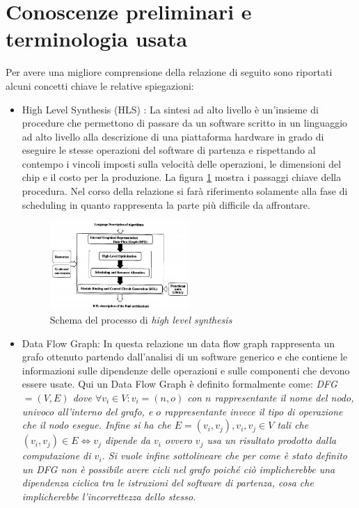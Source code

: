 \documentclass[]{IEEEtran}
\begin{document}
\section{Conoscenze preliminari e terminologia usata}

Per avere una migliore comprensione della relazione di seguito sono riportati alcuni concetti chiave le relative spiegazioni:
\begin{itemize}
	\item High Level Synthesis (HLS) \cite{HLS}: La sintesi ad alto livello è un'insieme di procedure che permettono di passare da un software scritto in un linguaggio ad alto livello alla descrizione di una piattaforma hardware in grado di eseguire le stesse operazioni del software di partenza e rispettando al contempo i vincoli imposti sulla velocità delle operazioni, le dimensioni del chip e il costo per la produzione. La figura \ref{hls} mostra i passaggi chiave della procedura. Nel corso della relazione si farà riferimento solamente alla fase di scheduling in quanto rappresenta la parte più difficile da affrontare.
	\begin{figure}[htp]
		\includegraphics[width=0.5\textwidth]{images/Hls_flow.png}
		\caption{Schema del processo di \emph{high level synthesis}}
		\label{hls}
	\end{figure}
	
	\item Data Flow Graph: In questa relazione un data flow graph rappresenta un grafo ottenuto partendo dall'analisi di un software generico e che contiene le informazioni sulle dipendenze delle operazioni e sulle componenti che devono essere usate. Qui un Data Flow Graph è definito formalmente come:
	\it{DFG} \normalfont $=(V,E)$ dove $\forall v_i\in V : v_i = (n,o)$ con $n$ rappresentante il nome del nodo, \emph{univoco} all'interno del grafo, e $o$ rappresentante invece il tipo di operazione che il nodo esegue. Infine si ha che $E = {(v_i,v_j)}, v_i,v_j \in V$ tali che $(v_i,v_j) \in E \iff v_j$ dipende da $v_i$ ovvero $v_j$ usa un risultato prodotto dalla computazione di $v_i$. Si vuole infine sottolineare che per come è stato definito un DFG non è possibile avere cicli nel grafo poiché ciò implicherebbe una dipendenza ciclica tra le istruzioni del software di partenza, cosa che implicherebbe l'incorrettezza dello stesso.
	

\end{itemize}
\end{document}
